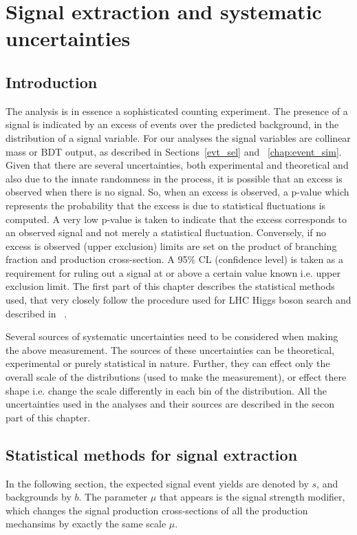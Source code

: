 
%
%

\chapter{Signal extraction and systematic uncertainties}
\label{sig_ext}
\section{Introduction}
The analysis is in essence a sophisticated counting experiment. The presence of a signal is indicated by an excess of events over the predicted background, in the distribution of a signal variable. For our analyses the signal variables are collinear mass or BDT output, as described in Sections~\ref{evt_sel} and ~\ref{chap:event_sim}. Given that there are several uncertainties, both experimental and theoretical and also due to the innate randomness in the process, it is possible that an excess is observed when there is no signal. So, when an excess is observed, a p-value which represents the probability that the excess is due to statistical fluctuations is computed. A very low p-value is taken to indicate that the excess corresponds to an observed signal and not merely a statistical fluctuation. Conversely, if no excess is observed (upper exclusion) limits are set on the product of branching fraction and production cross-section. A 95\% CL (confidence level) is taken as a requirement for ruling out a signal at or above a certain value known i.e. upper exclusion limit. The first part of this chapter describes the statistical methods used, that very closely follow the procedure used for LHC Higgs boson search and described in ~\cite{note2011}.

Several sources of systematic uncertainties need to be considered when making the above measurement. The sources of these uncertainties can be theoretical, experimental or purely statistical in nature. Further, they can effect only the overall scale of the distributions (used to make the measurement), or effect there shape i.e. change the scale differently in each bin of the distribution. All the uncertainties used in the analyses and their sources are described in the secon part of this chapter.      



\section{Statistical methods for signal extraction}
In the following section, the expected signal event yields are denoted by $s$, and backgrounds by $b$. The parameter $\mu$ that appears is the signal strength modifier, which changes the signal production cross-sections of all the production mechansims by exactly the same scale $\mu$.
\label{stat_meth}
